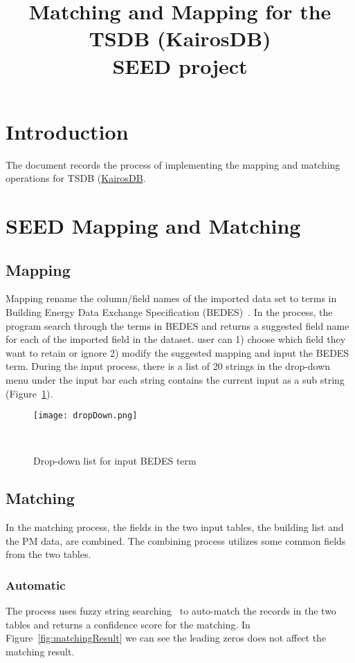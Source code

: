 \documentclass[12pt]{article}
\newcommand{\fref}[1]{Figure~\ref{#1}}
\begin{document}
\title{Matching and Mapping for the TSDB (KairosDB)\\
       \large SEED project}
\maketitle
\tableofcontents
\newpage
\section{Introduction}\label{sec:intro}
The document records the process of implementing the mapping and
matching operations for TSDB
(\href{https://code.google.com/p/kairosdb/}{KairosDB}.

\section{SEED Mapping and Matching}\label{sec:def}
\subsection{Mapping}
Mapping rename the column/field names of the imported data set to
terms in Building Energy Data Exchange Specification
(BEDES)~\cite{BEDES2015}. In the process, the program search through
the terms in BEDES and returns a suggested field name for each of the
imported field in the dataset. user can 1) choose which field they
want to retain or ignore 2) modify the suggested mapping and input the
BEDES term. During the input process, there is a list of 20 strings in
the drop-down menu under the input bar each string contains the
current input as a sub string (\fref{fig:dropDown}).

\begin{figure}[h!]
  \centering
  \texttt{[image: dropDown.png]}
  \caption{Drop-down list for input BEDES term}~\cite{SEEDWebpage2015}
  \label{fig:dropDown}
\end{figure}

\subsection{Matching} 

In the matching process, the fields in the two input tables, the
building list and the PM data, are combined. The combining process
utilizes some common fields from the two tables. 

\subsubsection{Automatic}
The process uses fuzzy string searching~\cite{SEEDTutorial2015,
  approxStringMatchWiki} to auto-match the records in the two tables
and returns a confidence score for the matching. In
\fref{fig:matchingResult} we can see the leading zeros does not affect
the matching result.
\end{document}
